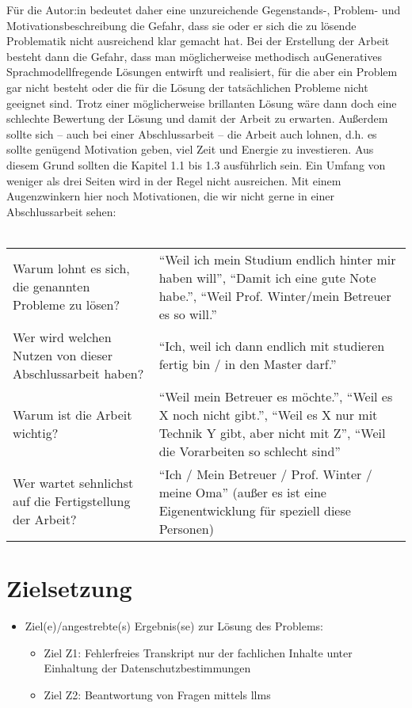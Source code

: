 Für die Autor:in bedeutet daher eine unzureichende Gegenstands-, Problem- und Motivationsbeschreibung die Gefahr, dass sie oder er sich die zu lösende Problematik nicht ausreichend klar gemacht hat.
Bei der Erstellung der Arbeit besteht dann die Gefahr, dass man möglicherweise methodisch auGeneratives Sprachmodellfregende Lösungen entwirft und realisiert, für die aber ein Problem gar nicht besteht oder die für die Lösung der tatsächlichen Probleme nicht geeignet sind.
Trotz einer möglicherweise brillanten Lösung wäre dann doch eine schlechte Bewertung der Lösung und damit der Arbeit zu erwarten.
Außerdem sollte sich -- auch bei einer Abschlussarbeit -- die Arbeit auch lohnen, d.h. es sollte genügend Motivation geben, viel Zeit und Energie zu investieren.
Aus diesem Grund sollten die Kapitel 1.1 bis 1.3 ausführlich sein.
Ein Umfang von weniger als drei Seiten wird in der Regel nicht ausreichen.
Mit einem Augenzwinkern hier noch Motivationen, die wir nicht gerne in einer Abschlussarbeit sehen:\\
~~\\

\begin{tabulary}{0.965\textwidth}{LL}
Warum lohnt es sich, die genannten Probleme zu lösen?						&\enquote{Weil ich mein Studium endlich hinter mir haben will}, \enquote{Damit ich eine gute Note habe.}, \enquote{Weil Prof. Winter/mein Betreuer es so will.}\\
Wer wird welchen Nutzen von dieser Abschlussarbeit haben?					&\enquote{Ich, weil ich dann endlich mit studieren fertig bin / in den Master darf.}\\
Warum ist die Arbeit wichtig?												&\enquote{Weil mein Betreuer es möchte.}, \enquote{Weil es X noch nicht gibt.}, \enquote{Weil es X nur mit Technik Y gibt, aber nicht mit Z}, \enquote{Weil die Vorarbeiten so schlecht sind}\\
Wer wartet sehnlichst auf die Fertigstellung der Arbeit?					&\enquote{Ich / Mein Betreuer / Prof. Winter / meine Oma} (außer es ist eine Eigenentwicklung für speziell diese Personen)\\
\end{tabulary}

\section{Zielsetzung}\label{sec:zielsetzung}

\begin{itemize}
\item Ziel(e)/angestrebte(s) Ergebnis(se) zur Lösung des Problems:
	\begin{itemize}
	\item Ziel Z1: Fehlerfreies Transkript nur der fachlichen Inhalte unter Einhaltung der Datenschutzbestimmungen~\citep{parlament2016verordnung}
	\item Ziel Z2: Beantwortung von Fragen mittels \acp{llm}
	\end{itemize}

\end{itemize}

